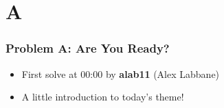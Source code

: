 \section{A}%
\label{sec:a}

\begin{frame}
  \frametitle{Problem A: Are You Ready?}

  \begin{itemize}
    \item First solve at 00:00 by \textbf{alab11} (Alex Labbane)
    \item A little introduction to today's theme!
  \end{itemize}

\end{frame}
